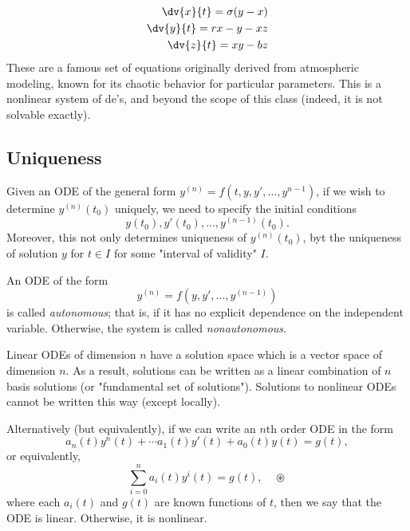 \begin{example}
    \begin{align*}
        \dv{x}{t} = \sigma (y - x)\\
        \dv{y}{t} = rx - y - xz\\
        \dv{z}{t} = xy - bz
    \end{align*}
    These are a famous set of equations originally derived from atmospheric modeling, known for its chaotic behavior for particular parameters. This is a nonlinear system of de's, and beyond the scope of this class (indeed, it is not solvable exactly).
\end{example}

\subsection{Uniqueness}

Given an ODE of the general form $y^{(n)} = f(t, y, y', \dots, y^{n-1})$, if we wish to determine $y^{(n)}(t_0)$ uniquely, we need to specify the initial conditions \[
y(t_0), y'(t_0), \dots, y^{(n-1)}(t_0).   
\]
Moreover, this not only determines uniqueness of $y^{(n)}(t_0)$, byt the uniqueness of solution $y$ for $t \in I$ for some "interval of validity" $I$.

\begin{definition}
    An ODE of the form \[
    y^{(n)} = f(y, y', \dots, y^{(n-1)})
    \]
    is called \emph{autonomous}; that is, if it has no explicit dependence on the independent variable. Otherwise, the system is called \emph{nonautonomous}.
\end{definition}

\begin{definition}
    Linear ODEs of dimension $n$ have a solution space which is a vector space of dimension $n$. As a result, solutions can be written as a linear combination of $n$ basis solutions (or "fundamental set of solutions"). Solutions to nonlinear ODEs cannot be written this way (except locally).

    Alternatively (but equivalently), if we can write an $n$th order ODE in the form \[a_n(t)y^n(t) + \cdots a_1(t)y'(t) + a_0(t)y(t) = g(t),\]
    or equivalently, 
    \[\sum_{i=0}^{n} a_i(t) y^{i}(t) = g(t), \quad \circledast \]
    where each $a_i(t)$ and $g(t)$ are known functions of $t$, then we say that the ODE is linear. Otherwise, it is nonlinear.
\end{definition}

